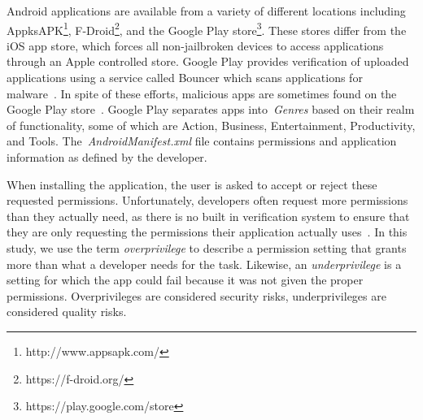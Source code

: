Android applications are available from a variety of different locations including AppksAPK\footnote{http://www.appsapk.com/}, F-Droid\footnote{https://f-droid.org/}, and the Google Play store\footnote{https://play.google.com/store}. These stores differ from the iOS app store, which forces all non-jailbroken devices to access applications through an Apple controlled store. Google Play provides verification of uploaded applications using a service called Bouncer which scans applications for malware~\cite{bouncer_url1}. In spite of these efforts, malicious apps are sometimes found on the Google Play store~\cite{Zhou:2012:DAM:2310656.2310710}. Google Play separates apps into~\emph{Genres} based on their realm of functionality, some of which are Action, Business, Entertainment, Productivity, and Tools. The~\emph{AndroidManifest.xml} file contains permissions and application information as defined by the developer.


When installing the application, the user is asked to accept or reject these requested permissions. Unfortunately, developers often request more permissions than they actually need, as there is no built in verification system to ensure that they are only requesting the permissions their application actually uses~\cite{Felt:2011:APD:2046707.2046779}. In this study, we use the term \emph{overprivilege} to describe a permission setting that grants more than what a developer needs for the task. Likewise, an \emph{underprivilege} is a setting for which the app could fail because it was not given the proper permissions. Overprivileges are considered security risks, underprivileges are considered quality risks.
